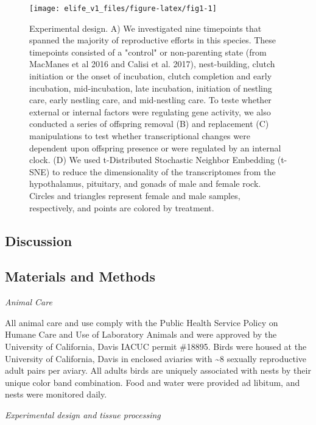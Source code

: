 \begin{Schunk}
\begin{figure}
\texttt{[image: elife\_v1\_files/figure-latex/fig1-1]} \caption[Experimental design]{Experimental design. A) We investigated nine timepoints that spanned the majority of reproductive efforts in this species. These timepoints consisted of a "control" or non-parenting state (from MacManes et al 2016 and Calisi et al. 2017), nest-building, clutch initiation or the onset of incubation, clutch completion and early incubation, mid-incubation, late incubation, initiation of nestling care, early nestling care, and mid-nestling care. To teste whether external or internal factors were regulating gene activity, we also conducted a series of offspring removal (B) and replacement (C) manipulations to test whether transcriptional changes were dependent upon offspring presence or were regulated by an internal clock. (D) We used t-Distributed Stochastic Neighbor Embedding (t-SNE) to reduce the dimensionality of the transcriptomes from the hypothalamus, pituitary, and gonads of male and female rock. Circles and triangles represent female and male samples, respectively, and points are colored by treatment.}\label{fig:fig1}
\end{figure}
\end{Schunk}

\hypertarget{discussion}{%
\subsection{Discussion}\label{discussion}}

\hypertarget{materials-and-methods}{%
\subsection{Materials and Methods}\label{materials-and-methods}}

\emph{Animal Care}

All animal care and use comply with the Public Health Service Policy on
Humane Care and Use of Laboratory Animals and were approved by the
University of California, Davis IACUC permit \#18895. Birds were housed
at the University of California, Davis in enclosed aviaries with
\textasciitilde{}8 sexually reproductive adult pairs per aviary. All
adults birds are uniquely associated with nests by their unique color
band combination. Food and water were provided ad libitum, and nests
were monitored daily.

\emph{Experimental design and tissue processing}

